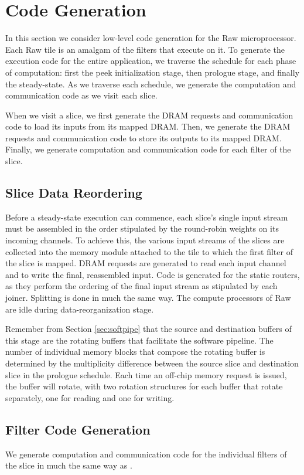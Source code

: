 \section{Code Generation}
\label{sec:codegen}
In this section we consider low-level code generation for the Raw
microprocessor. Each Raw tile is an amalgam of the filters that
execute on it. To generate the execution code for the entire
application, we traverse the schedule for each phase of computation:
first the peek initialization stage, then prologue stage, and finally
the steady-state.  As we traverse each schedule, we generate the
computation and communication code as we visit each slice.  

When we visit a slice, we first generate the DRAM requests and
communication code to load its inputs from its mapped DRAM. Then, we
generate the DRAM requests and communication code to store its outputs
to its mapped DRAM.  Finally, we generate computation and
communication code for each filter of the slice.

\subsection{Slice Data Reordering}
Before a steady-state execution can commence, each slice's single
input stream must be assembled in the order stipulated by the
round-robin weights on its incoming channels. To achieve this, the
various input streams of the slices are collected into the memory
module attached to the tile to which the first filter of the slice is
mapped. DRAM requests are generated to read each input
channel and to write the final, reassembled input.  Code is generated
for the static routers, as they perform the ordering of the final
input stream as stipulated by each joiner.  Splitting is done in much
the same way.  The compute processors of Raw are idle during
data-reorganization stage.

Remember from Section \ref{sec:softpipe} that the source and
destination buffers of this stage are the rotating buffers that
facilitate the software pipeline.  The number of individual memory
blocks that compose the rotating buffer is determined by the
multiplicity difference between the source slice and destination slice
in the prologue schedule.  Each time an off-chip memory request is
issued, the buffer will rotate, with two rotation structures for each
buffer that rotate separately, one for reading and one for writing.

\subsection{Filter Code Generation}
We generate computation and communication code for the individual
filters of the slice in much the same way as \cite{streamit-asplos}.  

